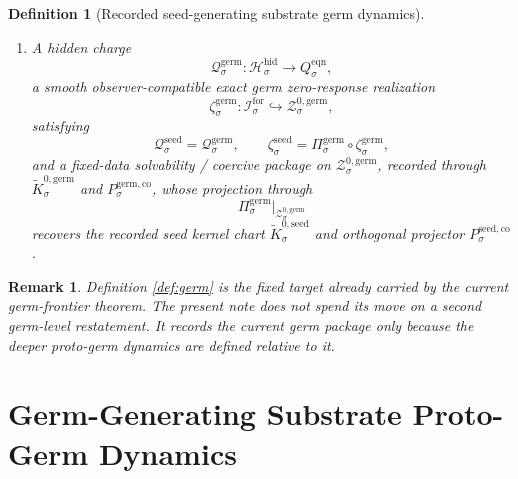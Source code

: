 \documentclass[11pt]{article}
\newcommand{\ForSpace}[1]{\mathcal I_{#1}^{\mathrm{for}}}
\newcommand{\EqnTarget}[1]{Q_{#1}^{\mathrm{eqn}}}
\newcommand{\HiddenSpace}[1]{\mathcal H_{#1}^{\mathrm{hid}}}
\newcommand{\HiddenBody}[1]{D_{#1}^{\mathrm{hid}}}
\newcommand{\SeedZeroCore}[1]{\mathcal Z_{#1}^{0,\mathrm{seed}}}
\newcommand{\SeedSplit}[1]{\Phi_{#1}^{\mathrm{seed}}}
\newcommand{\SeedCharge}[1]{\mathcal Q_{#1}^{\mathrm{seed}}}
\newcommand{\SeedEmbed}[1]{\zeta_{#1}^{\mathrm{seed}}}
\newcommand{\SeedKernelCh}[1]{\widetilde K_{#1}^{0,\mathrm{seed}}}
\newcommand{\SeedStateComp}[1]{P_{#1}^{\mathrm{seed,co}}}
\newcommand{\GermProj}[1]{\Pi_{#1}^{\mathrm{germ}}}
\newcommand{\GermShellSet}[1]{\mathcal Z_{#1}^{\mathrm{germ}}}
\newcommand{\GermZeroCore}[1]{\mathcal Z_{#1}^{0,\mathrm{germ}}}
\newcommand{\GermSplit}[1]{\Phi_{#1}^{\mathrm{germ}}}
\newcommand{\GermCharge}[1]{\mathcal Q_{#1}^{\mathrm{germ}}}
\newcommand{\GermEmbed}[1]{\zeta_{#1}^{\mathrm{germ}}}
\newcommand{\GermKernelCh}[1]{\widetilde K_{#1}^{0,\mathrm{germ}}}
\newcommand{\GermStateComp}[1]{P_{#1}^{\mathrm{germ,co}}}
\newtheorem{definition}{Definition}
\newtheorem{remark}{Remark}
\begin{document}
\begin{definition}[Recorded seed-generating substrate germ dynamics]
\begin{enumerate}
    \[
    \GermProj{\sigma}\big|_{\GermZeroCore{\sigma}}
    :
    \GermZeroCore{\sigma}
    \xrightarrow{\cong}
    \SeedZeroCore{\sigma},
    \]
    and a split diffeomorphism
    \[
    \GermSplit{\sigma}:
    \GermZeroCore{\sigma}\times\HiddenBody{\sigma}
    \xrightarrow{\cong}
    \GermShellSet{\sigma}
    \]
    obeying the projected split identity
    \[
    \SeedSplit{\sigma}(z,\eta)
    =
    \GermProj{\sigma}\Bigl(
    \GermSplit{\sigma}\bigl(
    (\GermProj{\sigma}\big|_{\GermZeroCore{\sigma}})^{-1}(z),\eta
    \bigr)\Bigr)
    \]
    for every \(z\in\SeedZeroCore{\sigma}\) and every \(\eta\in\HiddenBody{\sigma}\).
    \item A hidden charge
    \[
    \GermCharge{\sigma}:\HiddenSpace{\sigma}\to\EqnTarget{\sigma},
    \]
    a smooth observer-compatible exact germ zero-response realization
    \[
    \GermEmbed{\sigma}:\ForSpace{\sigma}\hookrightarrow\GermZeroCore{\sigma},
    \]
    satisfying
    \[
    \SeedCharge{\sigma}
    =
    \GermCharge{\sigma},
    \qquad
    \SeedEmbed{\sigma}
    =
    \GermProj{\sigma}\circ\GermEmbed{\sigma},
    \]
    and a fixed-data solvability / coercive package on \(\GermZeroCore{\sigma}\), recorded through \(\GermKernelCh{\sigma}\) and \(\GermStateComp{\sigma}\), whose projection through
    \[
    \GermProj{\sigma}\big|_{\GermZeroCore{\sigma}}
    \]
    recovers the recorded seed kernel chart \(\SeedKernelCh{\sigma}\) and orthogonal projector \(\SeedStateComp{\sigma}\).
\end{enumerate}
\end{definition}

\begin{remark}
Definition \ref{def:germ} is the fixed target already carried by the current germ-frontier theorem. The present note does not spend its move on a second germ-level restatement. It records the current germ package only because the deeper proto-germ dynamics are defined relative to it.
\end{remark}

\section{Germ-Generating Substrate Proto-Germ Dynamics}
\end{document}
